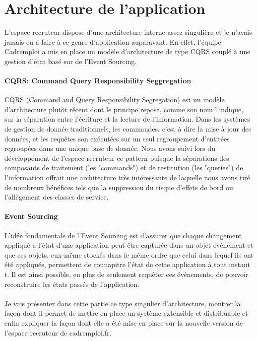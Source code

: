 \section{Architecture de l'application}
\label{sec:Architecture de l'application}
L'espace recruteur dispose d'une architecture interne assez singulière et je n'avais jamais eu à faire à ce genre d'application auparavant.
En effet, l'équipe Cadremploi a mis en place un modèle d'architecture de type CQRS couplé à une gestion d'état basé sur de l'Event Sourcing.

\paragraph{CQRS: Command Query Responsibility Seggregation}
\label{par:CQRS: Command Query Responsibility Seggregation}
CQRS (Command and Query Responsibility Segregation) est un modèle d'architecture plutôt récent dont le principe repose, comme son nom l'indique, sur la séparation entre l'écriture et la lecture de l'information.
Dans les systèmes de gestion de donnée traditionnels, les commandes, c'est à dire la mise à jour des données, et les requêtes son exécutées sur un seul regroupement d'entitées regroupées dans une unique base de donnée.
Nous avons suivi lors du développement de l'espace recruteur ce pattern puisque la séparations des composants de traitement (les "commands") et de restitution (les "queries") de l'information offrait une architecture très intéressante de laquelle nous avons tiré de nombreux bénéfices tels que la suppression du risque d'effets de bord ou l'allègement des classes de service.

\paragraph{Event Sourcing}
\label{par:Event Sourcing}
L'idée fondamentale de l'Event Sourcing est d'assurer que chaque changement appliqué à l'état d'une application peut être capturée dans un objet événement et que ces objets, eux-même stockés dans le même ordre que celui dans lequel ils ont été appliqués, permettent de connapitre l'état de cette application à tout instant t.
Il est ainsi possible, en plus de seulement requêter ces événements, de pouvoir reconstruire les états passés de l'application.

\paragraph{}
Je vais présenter dans cette partie ce type singulier d'architecture, montrer la façon dont il permet de mettre en place un système extensible et distribuable et enfin expliquer la façon dont elle a été mise en place sur la nouvelle version de l'espace recruteur de cadremploi.fr.



